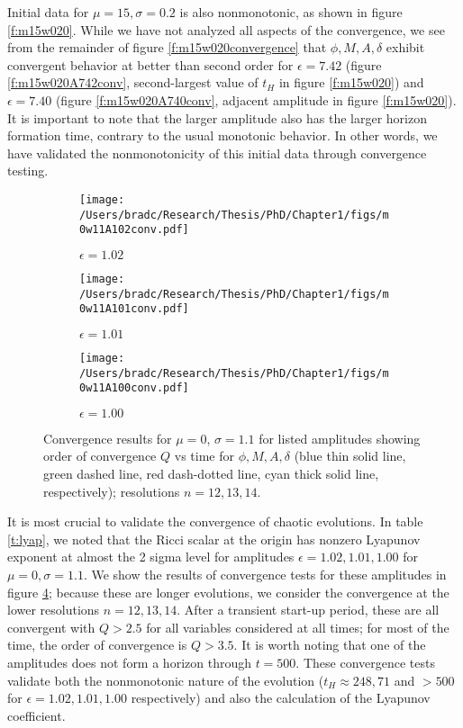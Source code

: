 \documentclass[../PhD.tex]{subfiles}
\begin{document}
\begin{subappendices}
Initial data for $\mu=15,\sigma=0.2$ is also nonmonotonic, as shown in 
figure \ref{f:m15w020}.  While we have not analyzed all aspects of the 
convergence, we see from the remainder of figure \ref{f:m15w020convergence}
that $\phi,M,A,\delta$ exhibit convergent behavior at better than
second order for $\epsilon=7.42$
(figure \ref{f:m15w020A742conv}, second-largest value of $t_H$ in 
figure \ref{f:m15w020}) and $\epsilon=7.40$ (figure \ref{f:m15w020A740conv},
adjacent amplitude in figure \ref{f:m15w020}).  It is important to note that
the larger amplitude also has the larger horizon formation time, contrary
to the usual monotonic behavior.  In other words, we have validated the
nonmonotonicity of this initial data through convergence testing.

\begin{figure}[!t]
\centering
\begin{subfigure}[t]{0.31\textwidth}
\texttt{[image: /Users/bradc/Research/Thesis/PhD/Chapter1/figs/m0w11A102conv.pdf]}
\caption{$\epsilon=1.02$}
\label{f:m0w11A102conv}
\end{subfigure}
\begin{subfigure}[t]{0.31\textwidth}
\texttt{[image: /Users/bradc/Research/Thesis/PhD/Chapter1/figs/m0w11A101conv.pdf]}
\caption{$\epsilon=1.01$}
\label{f:m0w11A101conv}
\end{subfigure}
\begin{subfigure}[t]{0.31\textwidth}
\texttt{[image: /Users/bradc/Research/Thesis/PhD/Chapter1/figs/m0w11A100conv.pdf]}
\caption{$\epsilon=1.00$}
\label{f:m0w11A100conv}
\end{subfigure}
\caption[Order of convergence for $\phi$, $M$, $A$, $\delta$ as a function of time for $\mu = 0$ at nearby amplitudes]{Convergence results for $\mu=0$, $\sigma=1.1$ for listed amplitudes
showing order of convergence $Q$ vs time for $\phi,M,A,\delta$ 
 (blue thin solid line, green dashed line, red 
dash-dotted line, cyan thick solid line, respectively); resolutions $n=12,13,14$.
}
\label{f:m0w11convergence}
\end{figure}

It is most crucial to validate the convergence of chaotic evolutions.
In table \ref{t:lyap}, we noted that the Ricci scalar at the origin has
nonzero Lyapunov exponent at almost the 2 sigma level for amplitudes
$\epsilon=1.02,1.01,1.00$ for $\mu=0,\sigma=1.1$.  We show the results of
convergence tests for these amplitudes in figure \ref{f:m0w11convergence};
because these are longer evolutions, we consider the convergence at the lower
resolutions $n=12,13,14$.  After a transient start-up period, these are all
convergent with $Q>2.5$ for all variables considered at all times; for most
of the time, the order of convergence is $Q>3.5$.  It is worth noting that
one of the amplitudes does not form a horizon through $t=500$.  
These convergence tests validate both the nonmonotonic nature of the
evolution ($t_H\approx 248,71$ and $>500$ for $\epsilon=1.02,1.01,1.00$
respectively) and also the calculation of the Lyapunov coefficient.


\end{subappendices}
\end{document}
